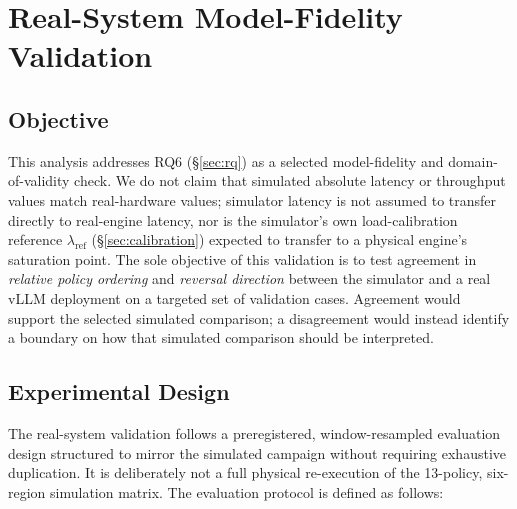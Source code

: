 \section{Real-System Model-Fidelity Validation}
\label{sec:real-system}

\subsection{Objective}
\label{sec:real-system-objective}

This analysis addresses RQ6 (\S\ref{sec:rq}) as a selected
model-fidelity and domain-of-validity check. We do not claim that simulated
absolute latency or throughput values match real-hardware values; simulator
latency is not assumed to transfer directly to real-engine latency, nor is
the simulator's own load-calibration reference $\lambda_{\mathrm{ref}}$
(\S\ref{sec:calibration}) expected to transfer to a physical engine's
saturation point. The sole objective of this validation is to test agreement
in \emph{relative policy ordering} and \emph{reversal direction} between
the simulator and a real vLLM deployment on a targeted set of validation
cases. Agreement would support the selected simulated comparison; a
disagreement would instead identify a boundary on how that simulated
comparison should be interpreted.

\subsection{Experimental Design}
\label{sec:real-system-design}

The real-system validation follows a preregistered, window-resampled
evaluation design structured to mirror the simulated campaign without
requiring exhaustive duplication. It is deliberately not a full physical
re-execution of the 13-policy, six-region simulation matrix. The evaluation
protocol is defined as follows:

